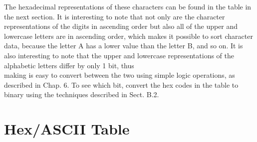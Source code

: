 \documentclass[10pt]{book}
\begin{document}
The hexadecimal representations of these characters can be found in the table in the next section. It is interesting to note that not only are the character representations of the digits in ascending order but also all of the upper and lowercase letters are in ascending order, which makes it possible to sort character data, because the letter A has a lower value than the letter B, and so on. It is also interesting to note that the upper and lowercase representations of the alphabetic letters differ by only 1 bit, thus\\
making is easy to convert between the two using simple logic operations, as described in Chap. 6. To see which bit, convert the hex codes in the table to binary using the techniques described in Sect. B.2.

\section{Hex/ASCII Table}
\end{document}
